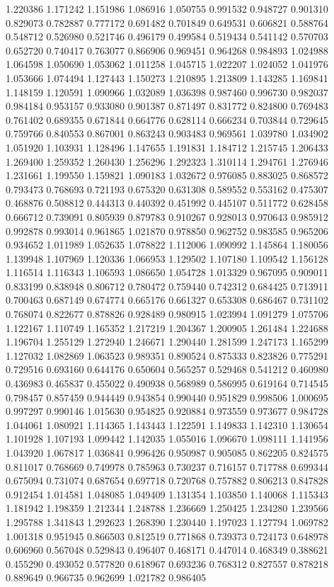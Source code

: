 1.220386
1.171242
1.151986
1.086916
1.050755
0.991532
0.948727
0.901310
0.829073
0.782887
0.777172
0.691482
0.701849
0.649531
0.606821
0.588764
0.548712
0.526980
0.521746
0.496179
0.499584
0.519434
0.541142
0.570703
0.652720
0.740417
0.763077
0.866906
0.969451
0.964268
0.984893
1.024988
1.064598
1.050690
1.053062
1.011258
1.045715
1.022207
1.024052
1.041976
1.053666
1.074494
1.127443
1.150273
1.210895
1.213809
1.143285
1.169841
1.148159
1.120591
1.090966
1.032089
1.036398
0.987460
0.996730
0.982037
0.984184
0.953157
0.933080
0.901387
0.871497
0.831772
0.824800
0.769483
0.761402
0.689355
0.671844
0.664776
0.628114
0.666234
0.703844
0.729645
0.759766
0.840553
0.867001
0.863243
0.903483
0.969561
1.039780
1.034902
1.051920
1.103931
1.128496
1.147655
1.191831
1.184712
1.215745
1.206433
1.269400
1.259352
1.260430
1.256296
1.292323
1.310114
1.294761
1.276946
1.231661
1.199550
1.159821
1.090183
1.032672
0.976085
0.883025
0.868572
0.793473
0.768693
0.721193
0.675320
0.631308
0.589552
0.553162
0.475307
0.468876
0.508812
0.444313
0.440392
0.451992
0.445107
0.511772
0.628458
0.666712
0.739091
0.805939
0.879783
0.910267
0.928013
0.970643
0.985912
0.992878
0.993014
0.961865
1.021870
0.978850
0.962752
0.983585
0.965206
0.934652
1.011989
1.052635
1.078822
1.112006
1.090992
1.145864
1.180056
1.139948
1.107969
1.120336
1.066953
1.129502
1.107180
1.109542
1.156128
1.116514
1.116343
1.106593
1.086650
1.054728
1.013329
0.967095
0.909011
0.833199
0.838948
0.806712
0.780472
0.759440
0.742312
0.684425
0.713911
0.700463
0.687149
0.674774
0.665176
0.661327
0.653308
0.686467
0.731102
0.768074
0.822677
0.878826
0.928489
0.980915
1.023994
1.091279
1.075706
1.122167
1.110749
1.165352
1.217219
1.204367
1.200905
1.261484
1.224688
1.196704
1.255129
1.272940
1.246671
1.290440
1.281599
1.247173
1.165299
1.127032
1.082869
1.063523
0.989351
0.890524
0.875333
0.823826
0.775291
0.729516
0.693160
0.644176
0.650604
0.565257
0.529468
0.541212
0.460980
0.436983
0.465837
0.455022
0.490938
0.568989
0.586995
0.619164
0.714545
0.798457
0.857459
0.944449
0.943854
0.990440
0.951829
0.998506
1.000695
0.997297
0.990146
1.015630
0.954825
0.920884
0.973559
0.973677
0.984728
1.044061
1.080921
1.114365
1.143443
1.122591
1.149833
1.142310
1.130654
1.101928
1.107193
1.099442
1.142035
1.055016
1.096670
1.098111
1.141956
1.043920
1.067817
1.036841
0.996426
0.950987
0.905085
0.862205
0.824575
0.811017
0.768669
0.749978
0.785963
0.730237
0.716157
0.717788
0.699344
0.675094
0.731074
0.687654
0.697718
0.720768
0.757882
0.806213
0.847828
0.912454
1.014581
1.048085
1.049409
1.131354
1.103850
1.140068
1.115343
1.181942
1.198359
1.212344
1.248788
1.236669
1.250425
1.234280
1.239566
1.295788
1.341843
1.292623
1.268390
1.230440
1.197023
1.127794
1.069782
1.001318
0.951945
0.866503
0.812519
0.771868
0.739373
0.724173
0.648978
0.606960
0.567048
0.529843
0.496407
0.468171
0.447014
0.468349
0.388621
0.455290
0.493052
0.577820
0.618967
0.693236
0.768312
0.827557
0.878218
0.889649
0.966735
0.962699
1.021782
0.986405
